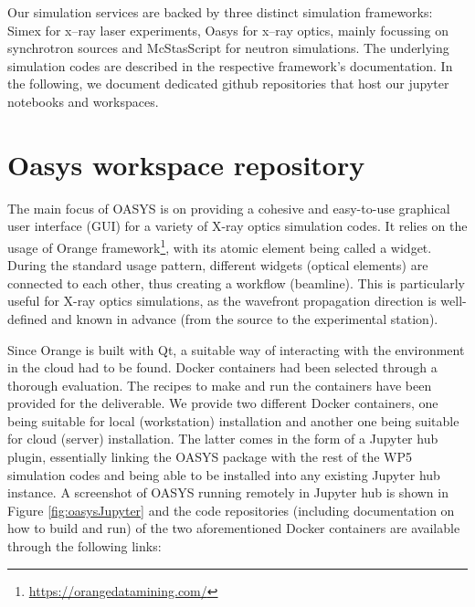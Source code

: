 \documentclass[10pt]{scrartcl}
\begin{document}
Our simulation services are backed by three distinct simulation frameworks:
Simex for x--ray laser experiments, Oasys for x--ray optics, mainly focussing on
synchrotron sources and McStasScript for neutron simulations. The underlying
simulation codes are described in the respective framework's documentation. In
the following, we document dedicated github repositories that host our jupyter
notebooks and workspaces.


\section{Oasys workspace repository}
\label{sec:oasys}
The main focus of OASYS is on providing a cohesive and easy-to-use graphical user interface (GUI) for a variety of X-ray optics simulation codes. It relies on the usage of Orange framework\footnote{\url{https://orangedatamining.com/}}, with its atomic element being called a widget. During the standard usage pattern, different widgets (optical elements) are connected to each other, thus creating a workflow (beamline). This is particularly useful for X-ray optics simulations, as the wavefront propagation direction is well-defined and known in advance (from the source to the experimental station).

Since Orange is built with Qt, a suitable way of interacting with the environment in the cloud had to be found. Docker containers had been selected through a thorough evaluation. The recipes to make and run the containers have been provided for the deliverable. We provide two different Docker containers, one being suitable for local (workstation) installation and another one being suitable for cloud (server) installation. The latter comes in the form of a Jupyter hub plugin, essentially linking the OASYS package with the rest of the WP5 simulation codes and being able to be installed into any existing Jupyter hub instance.  A screenshot of OASYS running remotely in Jupyter hub is shown in Figure \ref{fig:oasysJupyter} and the code repositories (including documentation on how to build and run) of the two aforementioned Docker containers are available through the following links:
\end{document}
